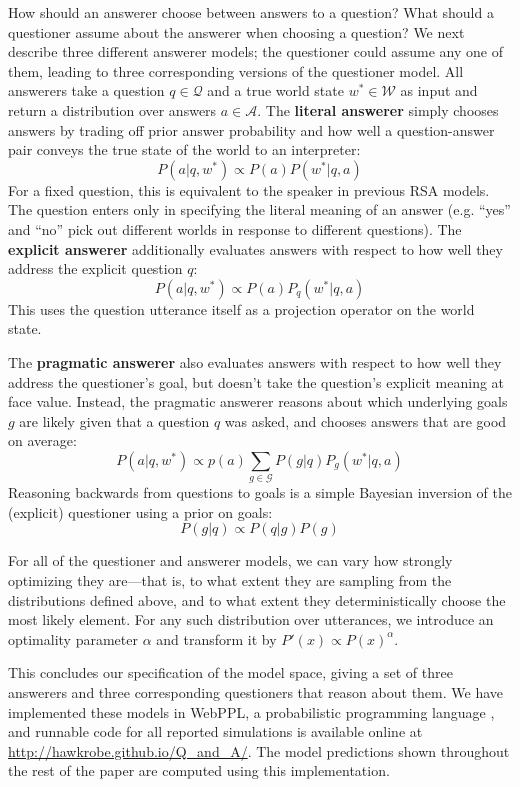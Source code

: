 \documentclass[12pt, floatsintext, jou]{apa6}
\begin{document}
How should an answerer choose between answers to a question? What should a questioner assume about the answerer when choosing a question? We next describe three different answerer models; the questioner could assume any one of them, leading to three corresponding versions of the questioner model.
All answerers take a question $q \in \mathcal{Q}$ and a true world state $w^* \in \mathcal{W}$ as input and return a distribution over answers $a \in \mathcal{A}$.
%
The \textbf{literal answerer} simply chooses answers by trading off prior answer probability  and how well a question-answer pair conveys the true state of the world to an interpreter:
%
$$P(a | q,w^*) \propto P(a) P(w^* | q, a) $$
%
For a fixed question, this is equivalent to the speaker in previous RSA models. The question enters only in specifying the literal meaning of an answer (e.g. ``yes'' and ``no'' pick out different worlds in response to different questions).
%
The \textbf{explicit answerer} additionally evaluates answers with respect to how well they address the explicit question $q$:
%
$$P(a | q, w^*) \propto P(a) P_q(w^* | q, a) $$
This uses the question utterance itself as a projection operator on the world state.

The \textbf{pragmatic answerer} also evaluates answers with respect to how well they address the questioner's goal, but doesn't take the question's explicit meaning at face value. Instead, the pragmatic answerer reasons about which underlying goals $g$ are likely given that a question $q$ was asked, and chooses answers that are good on average:
%
$$
P(a | q, w^*) \propto p(a) \sum_{g \in \mathcal{G}} P(g|q) P_g(w^*|q, a)
$$
Reasoning backwards from questions to goals is a simple Bayesian inversion of the (explicit) questioner using a prior on goals:
$$
P(g|q) \propto P(q|g)P(g)
$$


For all of the questioner and answerer models, we can vary how strongly optimizing they are---that is, to what extent they are sampling from the distributions defined above, and to what extent they deterministically choose the most likely element. For any such distribution over utterances, we introduce an optimality parameter $\alpha$ and transform it by $ P'(x) \propto P(x)^{\alpha} $.
%

This concludes our specification of the model space, giving a set of three answerers and three corresponding questioners that reason about them. We have implemented these models in WebPPL, a probabilistic programming language \cite{GoodmanStuhlmuller14_DIPPL}, and runnable code for all reported simulations is available online at \url{http://hawkrobe.github.io/Q\_and\_A/}. The model predictions shown throughout the rest of the paper are computed using this implementation. 
\end{document}
